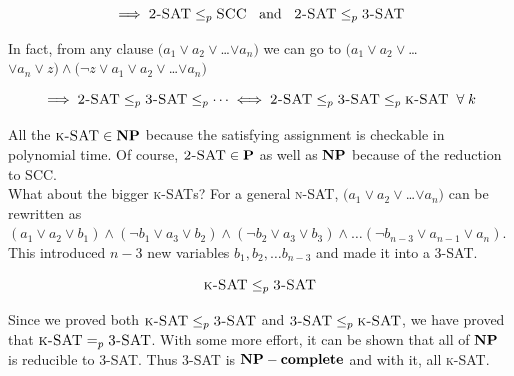 \[
\implies \textsc{2-SAT}\le_p\textsc{SCC} \;\; \text{ and } \;\;\textsc{2-SAT} \le_p \textsc{3-SAT}
\]

In fact, from any clause $(a_1 \vee a_2 \vee $\dots$ \vee a_n)$ we can go to 
$(a_1 \vee a_2 \vee $\dots$ \vee a_n \vee z) \wedge (\neg z \vee a_1 \vee a_2 \vee $\dots$ \vee a_n)$

\[
\implies \textsc{2-SAT} \le_p \textsc{3-SAT} \le_p \dots
\iff \textsc{2-SAT} \le_p \textsc{3-SAT} \le_p \textsc{k-SAT} \;\; \forall \; k 
\]

All the $\textsc{k-SAT} \in \mathbf{NP}$ because the satisfying assignment is checkable in polynomial time. Of 
course, $\textsc{2-SAT} \in \mathbf{P}$ as well as $\mathbf{NP}$ because of the reduction to \textsc{SCC}.\\


\noindent What about the bigger \textsc{k-SAT}s? For a general \textsc{n-SAT}, $(a_1 \vee a_2 \vee $\dots$ \vee a_n)$ 
can be rewritten as $(a_1 \vee a_2 \vee b_1) \wedge (\neg b_1 \vee a_3 \vee b_2) \wedge 
(\neg b_2 \vee a_3 \vee b_3) \wedge \dots (\neg b_{n-3} \vee a_{n-1} \vee a_{n})$. This introduced $n-3$ new 
variables $b_1, b_2, \dots b_{n-3}$ and made it into a \textsc{3-SAT}.

\[
\textsc{k-SAT} \le_p \textsc{3-SAT}
\]

Since we proved both $\textsc{k-SAT} \le_p \textsc{3-SAT}$ and $\textsc{3-SAT} \le_p \textsc{k-SAT}$, we 
have proved that $\textsc{k-SAT} =_p \textsc{3-SAT}$. With some more effort, it can be shown that all of $\mathbf{NP}$ is 
reducible to \textsc{3-SAT}. Thus \textsc{3-SAT} is $\mathbf{NP-complete}$ and with it, all \textsc{k-SAT}.

\begin{center}

\end{center}

